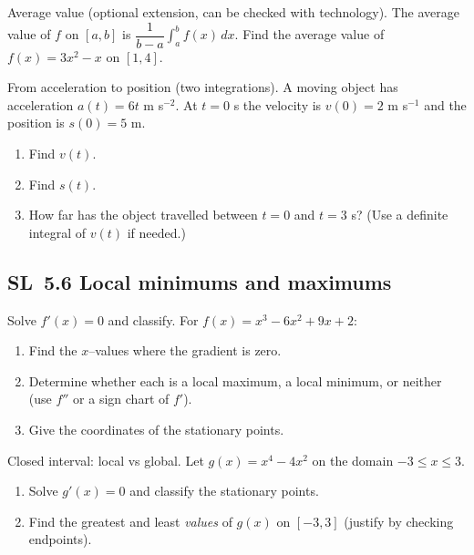 \documentclass[11pt]{article}
\def\textbf#1{#1}%
\newcommand{\tocsubsection}[1]{\subsection{#1}}
\newcounter{question}
\begin{document}
\begin{question}
\textbf{Average value (optional extension, can be checked with technology).}
The average value of $f$ on $[a,b]$ is $\dfrac{1}{b-a}\int_{a}^{b} f(x)\,dx$.  
Find the average value of $f(x)=3x^{2}-x$ on $[1,4]$.
\end{question}

\begin{question}
\textbf{From acceleration to position (two integrations).}
A moving object has acceleration $a(t)=6t$ m s$^{-2}$. At $t=0$ s the velocity is $v(0)=2$ m s$^{-1}$ and the position is $s(0)=5$ m.
\begin{enumerate}
  \item Find $v(t)$.
  \item Find $s(t)$.
  \item How far has the object travelled between $t=0$ and $t=3$ s? (Use a definite integral of $v(t)$ if needed.)
\end{enumerate}
\end{question}




\tocsubsection{SL 5.6 \; Local minimums and maximums}


\begin{question}
\textbf{Solve $f'(x)=0$ and classify.}
For $f(x)=x^{3}-6x^{2}+9x+2$:
\begin{enumerate}
  \item Find the $x$–values where the gradient is zero.
  \item Determine whether each is a local maximum, a local minimum, or neither (use $f''$ or a sign chart of $f'$).
  \item Give the coordinates of the stationary points.
\end{enumerate}
\end{question}

\begin{question}
\textbf{Closed interval: local vs global.}
Let $g(x)=x^{4}-4x^{2}$ on the domain $-3\le x\le 3$.
\begin{enumerate}
  \item Solve $g'(x)=0$ and classify the stationary points.
  \item Find the greatest and least \emph{values} of $g(x)$ on $[-3,3]$ (justify by checking endpoints).
\end{enumerate}
\end{question}
\end{document}
